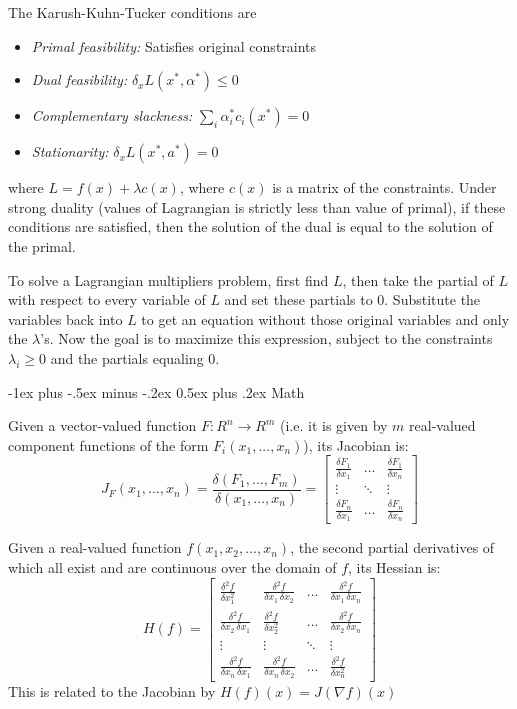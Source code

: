 \documentclass[10pt,landscape]{article}
\makeatletter
\renewcommand{\section}{\@startsection{section}{1}{0mm}%
                                {-1ex plus -.5ex minus -.2ex}%
                                {0.5ex plus .2ex}%
                                {\normalfont\large\bfseries}}
\makeatother
\begin{document}
\begin{multicols}{3}
The Karush-Kuhn-Tucker conditions are
\begin{itemize}
	\item \emph{Primal feasibility:} Satisfies original constraints
	\item \emph{Dual feasibility:} $\delta_x L(x^*, \alpha^*) \leq 0$
	\item \emph{Complementary slackness:} $\sum_{i} \alpha_i^* c_i(x^*) = 0$
	\item \emph{Stationarity:} $\delta_x L(x^*, a^*) = 0$
\end{itemize}
where $L = f(x) + \lambda c(x)$, where $c(x)$ is a matrix of the constraints. Under strong duality (values of Lagrangian is strictly less than value of primal), if these conditions are satisfied, then the solution of the dual is equal to the solution of the primal.

To solve a Lagrangian multipliers problem, first find $L$, then take the partial of $L$ with respect to every variable of $L$ and set these partials to 0. Substitute the variables back into $L$ to get an equation without those original variables and only the $\lambda$'s. Now the goal is to maximize this expression, subject to the constraints $\lambda_i \geq 0$ and the partials equaling 0.

\section{Math}

Given a vector-valued function $F: R^n \rightarrow R^m$ (i.e. it is given by $m$ real-valued component functions of the form $F_i(x_1, ..., x_n)$), its Jacobian is:
\begin{equation*}
J_F(x_1, ..., x_n) = \frac{\delta (F_1, ..., F_m)}{\delta (x_1, ..., x_n)} = \left[ \begin{array}{ccc}
	\frac{\delta F_1}{\delta x_1} & ... & \frac{\delta F_1}{\delta x_n}\\
	\vdots & \ddots & \vdots\\
	\frac{\delta F_n}{\delta x_1} & ... & \frac{\delta F_n}{\delta x_n}
 \end{array} \right]
\end{equation*}

Given a real-valued function $f(x_1, x_2, ..., x_n)$, the second partial derivatives of which all exist and are continuous over the domain of $f$, its Hessian is:
\begin{equation*}
H(f) = \left[ \begin{array}{cccc}
	\frac{\delta^2 f}{\delta x_1^2} & \frac{\delta^2 f}{\delta x_1\,\delta x_2} & ... & \frac{\delta^2 f}{\delta x_1\,\delta x_n}\\
	\frac{\delta^2 f}{\delta x_2\,\delta x_1} & \frac{\delta^2 f}{\delta x_2^2} & ... & \frac{\delta^2 f}{\delta x_2\,\delta x_n}\\
	\vdots & \vdots & \ddots & \vdots\\
	\frac{\delta^2 f}{\delta x_n\,\delta x_1} & \frac{\delta^2 f}{\delta x_n\,\delta x_2} & ... & \frac{\delta^2 f}{\delta x_n^2}
 \end{array} \right]
\end{equation*}
This is related to the Jacobian by $H(f)(x) = J(\nabla f)(x)$


\end{multicols}
\end{document}
